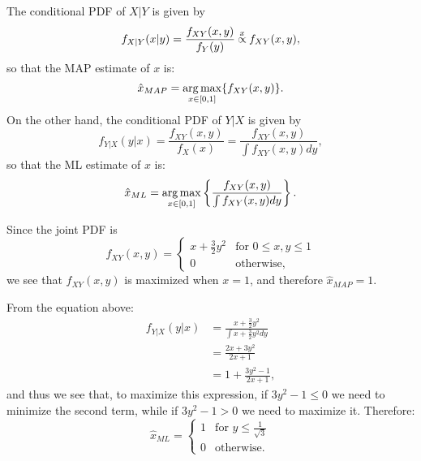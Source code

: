 \begin{problem}{3}  The conditional PDF of $X|Y$ is given by
\begin{equation*}
f_{X|Y}(x|y) = \frac{f_{XY}(x,y)}{f_{Y}(y)} \propof{x} f_{XY}(x,y),
\end{equation*}
so that the MAP estimate of $x$ is:
\begin{equation*}
\hat x_{MAP} = \operatorname*{arg\,max}_{x \in [0, 1]} \{ f_{XY}(x,y)\}.
\end{equation*}
On the other hand, the conditional PDF of $Y|X$ is given by
\begin{equation*}
f_{Y|X}(y|x) = \frac{f_{XY}(x,y)}{f_{X}(x)} = \frac{f_{XY}(x,y)}{\int f_{XY}(x,y)dy}, 
\end{equation*}
so that the ML estimate of $x$ is:
\begin{equation*}
\hat x_{ML} = \operatorname*{arg\,max}_{x \in [0, 1]}\left  \{ \frac{f_{XY}(x,y)}{\int f_{XY}(x,y)dy} \right \}.
\end{equation*}

Since the joint PDF is
\[
  f_{XY}(x,y) =
  \begin{cases}
                                   x+\frac{3}{2}y^2 & \text{for $0 \le x,y\le 1$} \\
                                   0 & \text{otherwise},
  \end{cases}
\]
we see that $ f_{XY}(x,y)$ is maximized when $x = 1$, and therefore $\hat x_{MAP} = 1$.

From the equation above:
\begin{align*}
f_{Y|X}(y|x) &=\frac{x+\frac{3}{2}y^2}{\int x+\frac{3}{2}y^2dy} \\
& = \frac{2x+3y^2}{2x+1} \\
&=1+\frac{3y^2-1}{2x+1},
\end{align*}
and thus we see that, to maximize this expression, if $3y^2-1\le 0$ we need to minimize the second term, while if $3y^2-1> 0$ we need to maximize it.  Therefore:
\[
  \hat x_{ML} =
  \begin{cases}
                                   1 & \text{for $y \le \frac{1}{\sqrt{3}}$} \\
                                   0 & \text{otherwise}.
  \end{cases}
\]


\end{problem}



